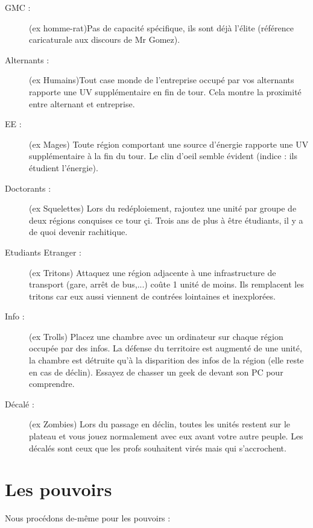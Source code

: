\documentclass[11pt]{report}
\begin{document}
\begin{description}
		\item[GMC :] (ex homme-rat)Pas de capacité spécifique, ils sont déjà l'élite (référence caricaturale aux discours de Mr Gomez).
		\item[Alternants :] (ex Humains)Tout case monde de l'entreprise occupé par vos alternants rapporte une UV supplémentaire en fin de tour. Cela montre la proximité entre alternant et entreprise.
		\item[EE : ] (ex Mages) Toute région comportant une source d'énergie rapporte une UV supplémentaire à la fin du tour. Le clin d'oeil semble évident (indice : ils étudient l'énergie).
		\item[Doctorants :] (ex Squelettes) Lors du redéploiement, rajoutez une unité par groupe de deux régions conquises ce tour çi. Trois ans de plus à être étudiants, il y a de quoi devenir rachitique.
		\item[Etudiants Etranger :] (ex Tritons) Attaquez une région adjacente à une infrastructure de transport (gare, arrêt de bus,...) coûte 1 unité de moins. Ils remplacent les tritons car eux aussi viennent de contrées lointaines et inexplorées.
		\item[Info :] (ex Trolls) Placez une chambre avec un ordinateur sur chaque région occupée par des infos. La défense du territoire est augmenté de une unité, la chambre est détruite qu'à la disparition des infos de la région (elle reste en cas de déclin). Essayez de chasser un geek de devant son PC pour comprendre.
		\item[Décalé :] (ex Zombies) Lors du passage en déclin, toutes les unités restent sur le plateau et vous jouez normalement avec eux avant votre autre peuple. Les décalés sont ceux que les profs souhaitent virés mais qui s'accrochent.
	\end{description}

	\section{Les pouvoirs}
	Nous procédons de-même pour les pouvoirs :
	
\end{document}

